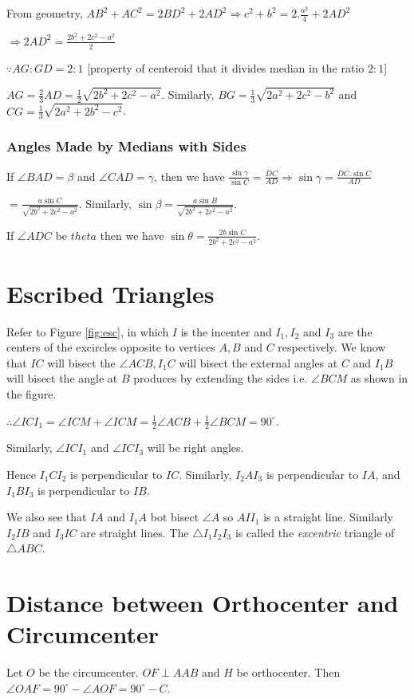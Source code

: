 From geometry, $AB^2 + AC^2 = 2BD^2 + 2AD^2 \Rightarrow c^2 + b^2 = 2.\frac{a^2}{4} + 2AD^2$

$\Rightarrow 2AD^2 = \frac{2b^2 + 2c^2 - a^2}{2}$

$\because AG:GD = 2:1$ [property of centeroid that it divides median in the ratio $2:1$]

$AG = \frac{2}{3}AD = \frac{1}{2}\sqrt{2b^2 + 2c^2 - a^2}$. Similarly, $BG = \frac{1}{3}\sqrt{2a^2 + 2c^2 - b^2}$ and $CG =
\frac{1}{3}\sqrt{2a^2 + 2b^2 - c^2}$.

\subsubsection{Angles Made by Medians with Sides}
If $\angle BAD = \beta$ and $\angle CAD = \gamma$, then we have $\frac{\sin\gamma}{\sin C} = \frac{DC}{AD} \Rightarrow \sin\gamma =
\frac{DC.\sin C}{AD}$

$= \frac{a\sin C}{\sqrt{2b^2 + 2c^2 - a^2}}$. Similarly, $\sin\beta = \frac{a\sin B}{\sqrt{2b^2 + 2c^2 - a^2}}$.

If $\angle ADC$ be $theta$ then we have $\sin\theta = \frac{2b\sin C}{2b^2 + 2c^2 - a^2}$.

\section{Escribed Triangles}
Refer to Figure {\ref{fig:esc}}, in which $I$ is the incenter and $I_1, I_2$ and $I_3$ are the centers of the excircles opposite to
vertices $A, B$ and $C$ respectively. We know that $IC$ will bisect the $\angle ACB, I_1C$ will bisect the external angles at $C$
and $I_1B$ will bisect the angle at $B$ produces by extending the sides i.e. $\angle BCM$ as shown in the figure.

$\therefore \angle ICI_1 = \angle ICM + \angle ICM = \frac{1}{2}\angle ACB + \frac{1}{2}\angle BCM = 90^\circ$.

Similarly, $\angle ICI_1$ and $\angle ICI_3$ will be right angles.

Hence $I_1CI_2$ is perpendicular to $IC$. Similarly, $I_2AI_3$ is perpendicular to $IA$, and $I_1BI_3$ is perpendicular to $IB$.

We also see that $IA$ and $I_1A$ bot bisect $\angle A$ so $AII_1$ is a straight line. Similarly $I_2IB$ and $I_3IC$ are straight
lines.
The $\triangle I_1I_2I_3$ is called the \textit{excentric} triangle of $\triangle ABC$.

\section{Distance between Orthocenter and Circumcenter}
Let $O$ be the circumcenter. $OF\perp AAB$ and $H$ be orthocenter. Then $\angle OAF = 90^\circ - \angle AOF = 90^\circ - C$.

